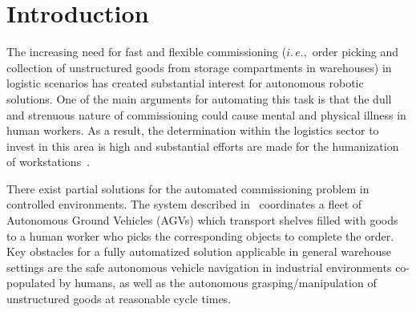 \section{Introduction}
\label{sec:intro}
%
The increasing need for fast and flexible commissioning ($i.\,e.,$ order picking and collection of
unstructured goods from storage compartments in warehouses) in logistic scenarios has created
substantial interest for autonomous robotic solutions. One of the main arguments for automating this
task is that the dull and strenuous nature of commissioning could cause mental and physical illness
in human workers. As a result, the determination within the logistics sector to invest in this area
is high and substantial efforts are made for the humanization of workstations~\cite{Eche08}.

There exist partial solutions for the automated commissioning problem in controlled
environments. The system described in~\cite{Wurm08} coordinates a fleet of Autonomous Ground
Vehicles (AGVs) which transport shelves filled with goods to a human worker who picks the
corresponding objects to complete the order. Key obstacles for a fully automatized solution
applicable in general warehouse settings are the safe autonomous vehicle navigation in industrial
environments co-populated by humans, as well as the autonomous grasping/manipulation of unstructured
goods at reasonable cycle times.
%
